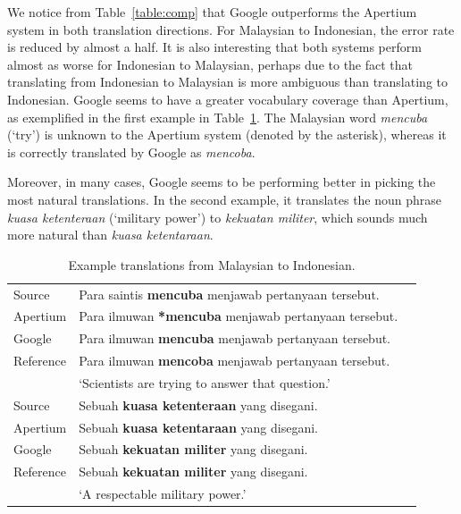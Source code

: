 \documentclass[10pt,a5paper,twoside]{article}
\begin{document}
We notice from Table~\ref{table:comp} that Google outperforms the Apertium system in both translation directions. For Malaysian to Indonesian, the error rate is reduced by almost a half. It is also interesting that both systems perform almost as worse for Indonesian to Malaysian, perhaps due to the fact that translating from Indonesian to Malaysian is more ambiguous than translating to Indonesian. Google seems to have a greater vocabulary coverage than Apertium, as exemplified in the first example in Table~\ref{table:ex}. The Malaysian word \emph{mencuba} (`try') is unknown to the Apertium system (denoted by the asterisk), whereas it is correctly translated by Google as \emph{mencoba}.

Moreover, in many cases, Google seems to be performing better in picking the most natural translations. In the second example, it translates the noun phrase \emph{kuasa ketenteraan} (`military power') to \emph{kekuatan militer}, which sounds much more natural than \emph{kuasa ketentaraan}.

\begin{table}[htbp]
  \begin{center}
  \begin{tabular}{llc}
  \toprule
  Source & Para saintis \textbf{mencuba} menjawab pertanyaan tersebut.\\
  Apertium & Para ilmuwan \textbf{*mencuba} menjawab pertanyaan tersebut.\\
  Google & Para ilmuwan \textbf{mencuba} menjawab pertanyaan tersebut.\\
  Reference & Para ilmuwan \textbf{mencoba} menjawab pertanyaan tersebut.\\
  & `Scientists are trying to answer that question.'\\
  \midrule
  Source & Sebuah \textbf{kuasa ketenteraan} yang disegani.\\
  Apertium & Sebuah \textbf{kuasa ketentaraan} yang disegani.\\
  Google & Sebuah \textbf{kekuatan militer} yang disegani.\\
  Reference & Sebuah \textbf{kekuatan militer} yang disegani.\\
  & `A respectable military power.'\\
  \bottomrule
  \end{tabular}
    \caption{Example translations from Malaysian to Indonesian.}
    \label{table:ex}
  \end{center}
\end{table}
\end{document}
